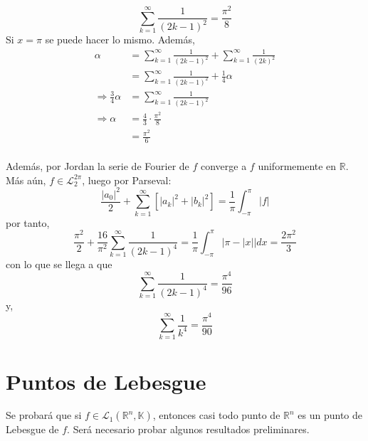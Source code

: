 \documentclass[12pt]{report}
\newcounter{it}
\theoremstyle{largebreak}
\newcommand\abs[1]{\ensuremath{\left|#1\right|}}
\begin{document}
\begin{exa}
\begin{equation*}
            \sum_{ k=1}^\infty\frac{1}{(2k-1)^2}=\frac{\pi^2}{8}
        \end{equation*}
        Si $x=\pi$ se puede hacer lo mismo. Además,
        \begin{equation*}
            \begin{split}
                \alpha&=\sum_{ k=1}^\infty\frac{1}{(2k-1)^2}+\sum_{ k=1}^\infty\frac{1}{(2k)^2}\\
                &=\sum_{ k=1}^\infty\frac{1}{(2k-1)^2}+\frac{1}{4}\alpha\\
                \Rightarrow \frac{3}{4}\alpha&=\sum_{ k=1}^\infty\frac{1}{(2k-1)^2}\\
                \Rightarrow \alpha&=\frac{4}{3}\cdot\frac{\pi^2}{8}\\
                &=\frac{\pi^2}{6}\\
            \end{split}
        \end{equation*}

        Además, por Jordan la serie de Fourier de $f$ converge a $f$ uniformemente en $\mathbb{R}$. Más aún, $f\in\mathcal{L}_2^{2\pi}$, luego por Parseval:
        \begin{equation*}
            \frac{\abs{a_0}^2}{2}+\sum_{ k=1}^\infty\left[\abs{a_k}^2+\abs{b_k}^2 \right]=\frac{1}{\pi}\int_{-\pi}^{\pi}\abs{f}
        \end{equation*}
        por tanto,
        \begin{equation*}
            \frac{\pi^2}{2}+\frac{16}{\pi^2}\sum_{ k=1}^\infty\frac{1}{(2k-1)^4}=\frac{1}{\pi}\int_{-\pi}^{\pi}\abs{\pi-\abs{x}}dx=\frac{2\pi^2}{3}
        \end{equation*}
        con lo que se llega a que
        \begin{equation*}
            \sum_{ k=1}^\infty\frac{1}{(2k-1)^4}=\frac{\pi^4}{96}
        \end{equation*}
        y,
        \begin{equation*}
            \sum_{ k=1}^\infty\frac{1}{k^4}=\frac{\pi^4}{90}
        \end{equation*}
    \end{exa}

    \section{Puntos de Lebesgue}    

    Se probará que si $f\in\mathcal{L}_1(\mathbb{R}^n,\mathbb{K})$, entonces casi todo punto de $\mathbb{R}^n$ es un punto de Lebesgue de $f$. Será necesario probar algunos resultados preliminares.
\end{document}

